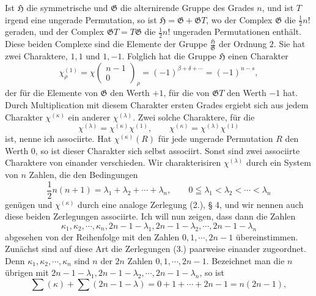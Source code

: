 \documentclass[11pt]{article}
\newcommand{\Hgr}{\mathfrak{H}}
\newcommand{\Ggr}{\mathfrak{G}}
\begin{document}
Ist $\Hgr$ die symmetrische und $\Ggr$ die alternirende Gruppe des Grades $n$, und ist $T$ irgend eine ungerade Permutation, so ist $\Hgr=\Ggr+
\Ggr T$, wo der Complex $\Ggr$ die $\frac12n!$ geraden, und der Complex $\Ggr T=T\Ggr$ die $\frac12n!$ ungeraden Permutationen enthält. Diese beiden Complexe sind die Elemente der Gruppe $\frac{\Hgr}{\Ggr}$ der Ordnung $2$. Sie hat zwei Charaktere, $1,1$ und $1,-1$. Folglich hat die Gruppe $\Hgr$ einen Charakter
\begin{equation}\tag{1.}
 \chi_\rho^{(1)}=\chi\left(\begin{matrix}n-1\\0\end{matrix}\right)_\rho=(-1)^{\beta+
\delta+
\cdots}=(-1)^{n-s},
\end{equation}
der für die Elemente von $\Ggr$ den Werth $+1$, für die von $\Ggr T$ den Werth $-1$ hat. Durch Multiplication mit diesem Charakter ersten Grades ergiebt sich aus jedem Charakter $\chi^{(\kappa)}$ ein anderer $\chi^{(\lambda)}$. Zwei solche Charaktere, für die
\begin{equation}\tag{2.}
 \chi^{(\lambda)}=\chi^{(\kappa)}\chi^{(1)},\qquad
 \chi^{(\kappa)}=\chi^{(\lambda)}\chi^{(1)}
\end{equation}
ist, nenne ich associirte. Hat $\chi^{(\kappa)}(R)$ für jede ungerade Permutation $R$ den Werth $0$, so ist dieser Charakter sich selbst associirt. Sonst sind zwei associirte Charaktere von einander verschieden. Wir charakterisiren $\chi^{(\lambda)}$ durch ein System von $n$ Zahlen, die den Bedingungen
\begin{equation}\tag{3.}
 \frac12n(n+1)=\lambda_1+
\lambda_2+
\cdots+
\lambda_n,
\qquad 0\leqq\lambda_1<\lambda_2<\cdots<\lambda_n
\end{equation}
genügen und $\chi^{(\kappa)}$ durch eine analoge Zerlegung (2.), § 4, und wir nennen auch diese beiden Zerlegungen associirte. Ich will nun zeigen, dass dann die Zahlen
\begin{equation}\tag{4.}
 \kappa_1,
\kappa_2,
\cdots,
\kappa_n,
 2n-1-
\lambda_1,
 2n-1-
\lambda_2,
\cdots,
 2n-1-
\lambda_n
\end{equation}
abgesehen von der Reihenfolge mit den Zahlen $0,1,
\cdots,2n-1$ übereinstimmen. Zunächst sind auf diese Art die Zerlegungen (3.) paarweise einander zugeordnet. Denn $\kappa_1,
\kappa_2,
\cdots,
\kappa_n$ sind $n$ der $2n$ Zahlen $0,1,
\cdots,2n-1$. Bezeichnet man die $n$ übrigen mit $2n-1-
\lambda_1,2n-1-
\lambda_2,
\cdots,2n-1-
\lambda_n$, so ist
\[
 \sum(\kappa)+
\sum(2n-1-
\lambda)=0+1+
\cdots+2n-1=n(2n-1),
\]
\end{document}
